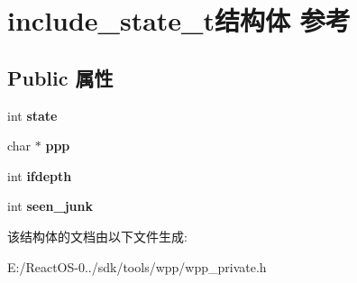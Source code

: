 \hypertarget{structinclude__state__t}{}\section{include\+\_\+state\+\_\+t结构体 参考}
\label{structinclude__state__t}
\subsection*{Public 属性}
\begin{DoxyCompactItemize}
\item 
\mbox{\label{structinclude__state__t_a2659b7fd37c6511781c9fd71d6884319}} 
int {\bfseries state}
\item 
\mbox{\label{structinclude__state__t_a1c7d2916f942d5db73bd7d3abdca6048}} 
char $\ast$ {\bfseries ppp}
\item 
\mbox{\label{structinclude__state__t_a614aee4f07d6f7a341b6521e57586a46}} 
int {\bfseries ifdepth}
\item 
\mbox{\label{structinclude__state__t_a383b951f59d00f0e90652924a3dda50a}} 
int {\bfseries seen\+\_\+junk}
\end{DoxyCompactItemize}


该结构体的文档由以下文件生成\+:\begin{DoxyCompactItemize}
\item 
E\+:/\+React\+O\+S-\/0../sdk/tools/wpp/wpp\+\_\+private.\+h\end{DoxyCompactItemize}
